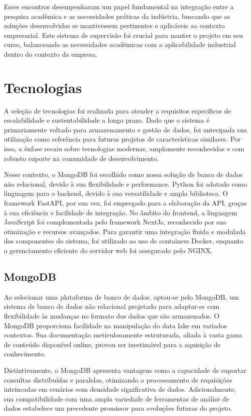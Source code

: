 Esses encontros desempenharam um papel fundamental na integração entre a pesquisa acadêmica e as necessidades práticas da indústria, buscando que as soluções desenvolvidas se mantivessem pertinentes e aplicáveis ao contexto empresarial. Este sistema de supervisão foi crucial para manter o projeto em seu curso, balanceando as necessidades acadêmicas com a aplicabilidade industrial dentro do contexto da empresa.


\section[Tecnologias]{Tecnologias}
A seleção de tecnologias foi realizada para atender a requisitos específicos de escalabilidade e sustentabilidade a longo prazo. Dado que o sistema é primariamente voltado para armazenamento e gestão de dados, foi antecipada sua utilização como referência para futuros projetos de características similares. Por isso, a ênfase recaiu sobre tecnologias modernas, amplamente reconhecidas e com robusto suporte na comunidade de desenvolvimento.

Nesse contexto, o MongoDB foi escolhido como nossa solução de banco de dados não relacional, devido à sua flexibilidade e performance. Python foi adotado como linguagem para o backend, devido à sua versatilidade e ampla biblioteca. O framework FastAPI, por sua vez, foi empregado para a elaboração da API, graças à sua eficiência e facilidade de integração. No âmbito do frontend, a linguagem JavaScript foi complementada pelo framework NextJs, reconhecido por sua otimização e recursos avançados. Para garantir uma integração fluida e modulada dos componentes do sistema, foi utilizado ao uso de containers Docker, enquanto o gerenciamento eficiente do servidor web foi assegurado pelo NGINX.

\subsection{MongoDB}
Ao selecionar uma plataforma de banco de dados, optou-se pelo MongoDB, um sistema de banco de dados não relacional projetado para adaptar-se com flexibilidade às mudanças no formato dos dados que são armazenados. O MongoDB proporciona facilidade na manipulação do data lake em variados contextos. Sua documentação meticulosamente estruturada, aliada à vasta gama de conteúdo disponível online, provou ser inestimável para a aquisição de conhecimento.

Distintivamente, o MongoDB apresenta vantagens como a capacidade de suportar consultas distribuídas e paralelas, otimizando o processamento de requisições intrincadas em cenários com densidade significativa de dados. Adicionalmente, sua compatibilidade com uma ampla variedade de ferramentas de análise de dados estabelece um precedente promissor para evoluções futuras do projeto.

